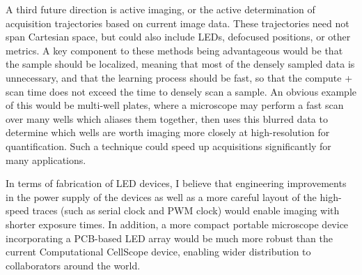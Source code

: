 A third future direction is active imaging, or the active determination of acquisition trajectories based on current image data. These trajectories need not span Cartesian space, but could also include LEDs, defocused positions, or other metrics. A key component to these methods being advantageous would be that the sample should be localized, meaning that most of the densely sampled data is unnecessary, and that the learning process should be fast, so that the compute + scan time does not exceed the time to densely scan a sample. An obvious example of this would be multi-well plates, where a microscope may perform a fast scan over many wells which aliases them together, then uses this blurred data to determine which wells are worth imaging more closely at high-resolution for quantification. Such a technique could speed up acquisitions significantly for many applications.

In terms of fabrication of LED devices, I believe that engineering improvements in the power supply of the devices as well as a more careful layout of the high-speed traces (such as serial clock and PWM clock) would enable imaging with shorter exposure times. In addition, a more compact portable microscope device incorporating a PCB-based LED array would be much more robust than the current Computational CellScope device, enabling wider distribution to collaborators around the world.
